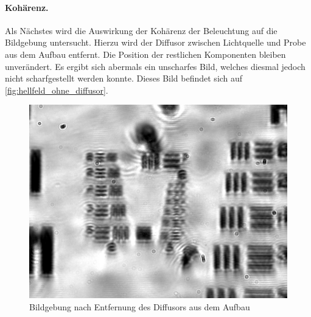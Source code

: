 \documentclass[ngerman]{scrartcl}
\begin{document}
\paragraph{Kohärenz.}
Als Nächstes wird die Auswirkung der Kohärenz der Beleuchtung auf die Bildgebung untersucht. Hierzu wird der Diffusor zwischen Lichtquelle und Probe aus dem Aufbau entfernt. Die Position der restlichen Komponenten bleiben unverändert. Es ergibt sich abermals ein unscharfes Bild, welches diesmal jedoch nicht scharfgestellt werden konnte. Dieses Bild befindet sich auf \autoref{fig:hellfeld_ohne_diffusor}.
%
\begin{figure}[H]
    \centering
    \begin{samepage}
        \includegraphics[width=0.475\linewidth]{fig/Versuch3/hellfeld_3.2_ohne_diffusor.jpg}
        \caption[Hellfeld Kohärenz]{Bildgebung nach Entfernung des Diffusors aus dem Aufbau}
        \label{fig:hellfeld_ohne_diffusor}
    \end{samepage}
\end{figure}
\end{document}
